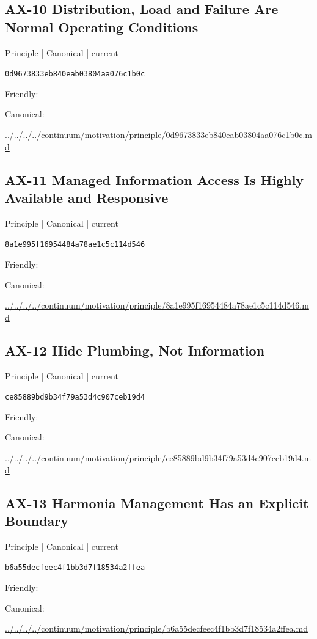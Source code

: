 \documentclass[10pt,a4paper]{article}
\begin{document}
\subsection*{AX-10 Distribution, Load and Failure Are Normal Operating Conditions}
{\small Principle | Canonical | current}\par
\texttt{0d9673833eb840eab03804aa076c1b0c}\par
Friendly: \par
Canonical: \par
{\footnotesize\url{../../../../continuum/motivation/principle/0d9673833eb840eab03804aa076c1b0c.md}}\par
\subsection*{AX-11 Managed Information Access Is Highly Available and Responsive}
{\small Principle | Canonical | current}\par
\texttt{8a1e995f16954484a78ae1c5c114d546}\par
Friendly: \par
Canonical: \par
{\footnotesize\url{../../../../continuum/motivation/principle/8a1e995f16954484a78ae1c5c114d546.md}}\par
\subsection*{AX-12 Hide Plumbing, Not Information}
{\small Principle | Canonical | current}\par
\texttt{ce85889bd9b34f79a53d4c907ceb19d4}\par
Friendly: \par
Canonical: \par
{\footnotesize\url{../../../../continuum/motivation/principle/ce85889bd9b34f79a53d4c907ceb19d4.md}}\par
\subsection*{AX-13 Harmonia Management Has an Explicit Boundary}
{\small Principle | Canonical | current}\par
\texttt{b6a55decfeec4f1bb3d7f18534a2ffea}\par
Friendly: \par
Canonical: \par
{\footnotesize\url{../../../../continuum/motivation/principle/b6a55decfeec4f1bb3d7f18534a2ffea.md}}\par
\end{document}
